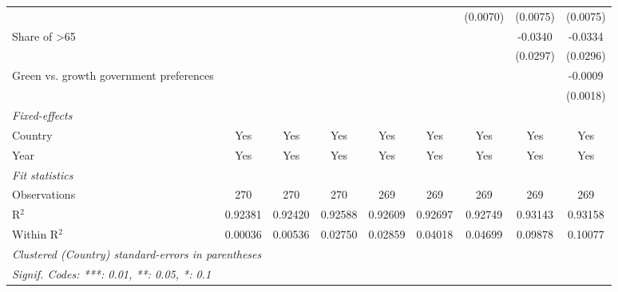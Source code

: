 \begin{table}[htbp]
\begin{tabular}{lcccccccc}
                                                              &          &          &          &          &          & (0.0070) & (0.0075) & (0.0075)\\   
      Share of >65                                            &          &          &          &          &          &          & -0.0340  & -0.0334\\   
                                                              &          &          &          &          &          &          & (0.0297) & (0.0296)\\   
      Green vs. growth government preferences                 &          &          &          &          &          &          &          & -0.0009\\   
                                                              &          &          &          &          &          &          &          & (0.0018)\\   
      \midrule
      \emph{Fixed-effects}\\
      Country                                                 & Yes      & Yes      & Yes      & Yes      & Yes      & Yes      & Yes      & Yes\\  
      Year                                                    & Yes      & Yes      & Yes      & Yes      & Yes      & Yes      & Yes      & Yes\\  
      \midrule
      \emph{Fit statistics}\\
      Observations                                            & 270      & 270      & 270      & 269      & 269      & 269      & 269      & 269\\  
      R$^2$                                                   & 0.92381  & 0.92420  & 0.92588  & 0.92609  & 0.92697  & 0.92749  & 0.93143  & 0.93158\\  
      Within R$^2$                                            & 0.00036  & 0.00536  & 0.02750  & 0.02859  & 0.04018  & 0.04699  & 0.09878  & 0.10077\\  
      \midrule \midrule
      \multicolumn{9}{l}{\emph{Clustered (Country) standard-errors in parentheses}}\\
      \multicolumn{9}{l}{\emph{Signif. Codes: ***: 0.01, **: 0.05, *: 0.1}}\\
   \end{tabular}
\end{table}


